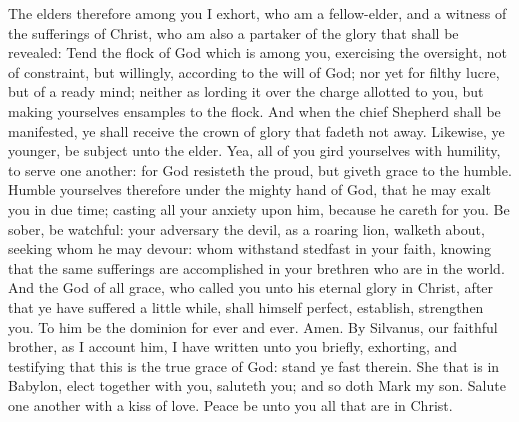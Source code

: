The elders therefore among you I exhort, who am a fellow-elder, and a witness of the sufferings of Christ, who am also a partaker of the glory that shall be revealed: Tend the flock of God which is among you, exercising the oversight, not of constraint, but willingly, according to the will of God; nor yet for filthy lucre, but of a ready mind; neither as lording it over the charge allotted to you, but making yourselves ensamples to the flock. And when the chief Shepherd shall be manifested, ye shall receive the crown of glory that fadeth not away. Likewise, ye younger, be subject unto the elder. Yea, all of you gird yourselves with humility, to serve one another: for God resisteth the proud, but giveth grace to the humble. Humble yourselves therefore under the mighty hand of God, that he may exalt you in due time; casting all your anxiety upon him, because he careth for you. Be sober, be watchful: your adversary the devil, as a roaring lion, walketh about, seeking whom he may devour: whom withstand stedfast in your faith, knowing that the same sufferings are accomplished in your brethren who are in the world. And the God of all grace, who called you unto his eternal glory in Christ, after that ye have suffered a little while, shall himself perfect, establish, strengthen you. To him be the dominion for ever and ever. Amen.  By Silvanus, our faithful brother, as I account him, I have written unto you briefly, exhorting, and testifying that this is the true grace of God: stand ye fast therein. She that is in Babylon, elect together with you, saluteth you; and so doth Mark my son. Salute one another with a kiss of love. Peace be unto you all that are in Christ. 
